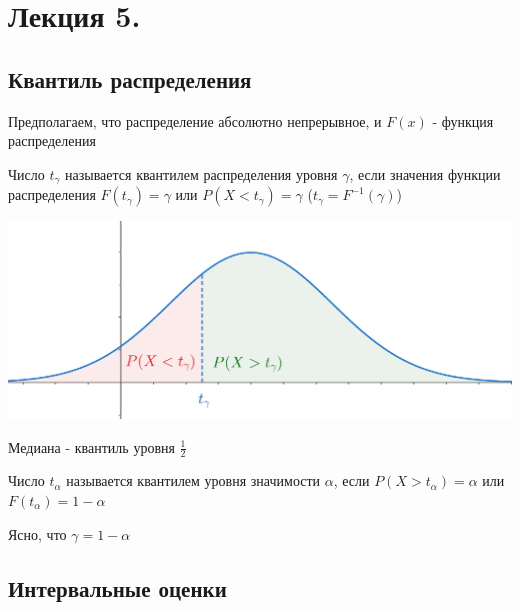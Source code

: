 \documentclass[12pt]{article}
\begin{document}






\section{Лекция 5.}

\subsection{Квантиль распределения}

\hypertarget{quantile_distribution}{}

Предполагаем, что распределение абсолютно непрерывное, и $F(x)$ - функция распределения

 Число $t_\gamma$ называется квантилем распределения уровня $\gamma$, если значения
функции распределения $F(t_\gamma) = \gamma$ или $P(X < t_\gamma) = \gamma$ ($t_\gamma = F^{-1}(\gamma)$)


\begin{center}
    \includegraphics[width=15cm]{mathstat/images/mathstat_2025_03_11_1}
\end{center}

\Ex Медиана - квантиль уровня $\frac{1}{2}$

 Число $t_\alpha$ называется квантилем уровня значимости $\alpha$, если
$P(X > t_\alpha) = \alpha$ или $F(t_\alpha) = 1 - \alpha$

Ясно, что $\gamma = 1 - \alpha$

\subsection{Интервальные оценки}

\hypertarget{interval_estimation}{}
\end{document}

